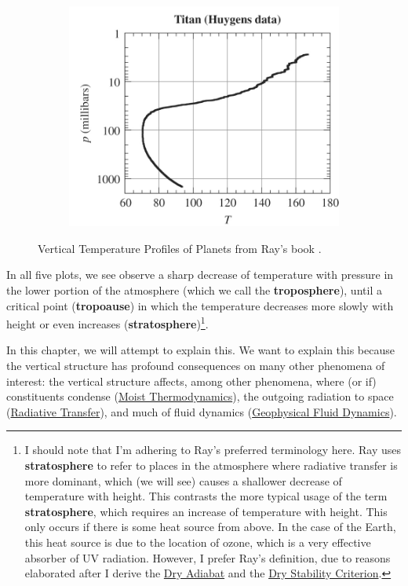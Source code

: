 \begin{figure}[H]
\begin{subfigure}[b]{0.3\linewidth}
        \includegraphics[width=\linewidth]{Figures/Thermodynamics/Titan Radiosonde.png}
    \end{subfigure}
    \caption{Vertical Temperature Profiles of Planets from Ray's book \cite{Ray}.}
\end{figure}

In all five plots, we see observe a sharp decrease of temperature with pressure in the lower portion of the atmosphere (which we call the \textbf{troposphere}), until a critical point (\textbf{tropoause}) in which the temperature decreases more slowly with height or even increases (\textbf{stratosphere})\footnote{
    I should note that I'm adhering to Ray's preferred terminology here. Ray uses \textbf{stratosphere} to refer to places in the atmosphere where radiative transfer is more dominant, which (we will see) causes a shallower decrease of temperature with height. This contrasts the more typical usage of the term \textbf{stratosphere}, which requires an increase of temperature with height. This only occurs if there is some heat source from above. In the case of the Earth, this heat source is due to the location of ozone, which is a very effective absorber of UV radiation. However, I prefer Ray's definition, due to reasons elaborated after I derive the \hyperref[Dry Adiabat Box]{Dry Adiabat} and the \hyperref[Dry Stability Box]{Dry Stability Criterion}. 
}.

In this chapter, we will attempt to explain this. We want to explain this because the vertical structure has profound consequences on many other phenomena of interest: the vertical structure affects, among other phenomena, where (or if) constituents condense (\hyperref[Moist Thermodynamics]{Moist Thermodynamics}), the outgoing radiation to space (\hyperref[Radiative Transfer]{Radiative Transfer}), and much of fluid dynamics (\hyperref[Geophysical Fluid Dynamics]{Geophysical Fluid Dynamics}). 

